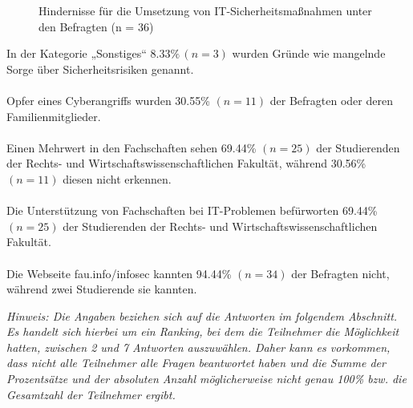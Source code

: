 \documentclass[german,report]{i1thesis}
\begin{document}
\begin{figure}[H]
\centering
{}
\caption{Hindernisse für die Umsetzung von IT-Sicherheitsmaßnahmen unter den Befragten (n = 36)}
\label{fig:hindernisse_it_sicherheit_balken}
\end{figure}
In der Kategorie „Sonstiges“ \(8.33\% \,(n = 3)\) wurden Gründe wie mangelnde Sorge über Sicherheitsrisiken genannt.\\
\\
Opfer eines Cyberangriffs wurden 30.55\% \((n = 11)\) der Befragten oder deren Familienmitglieder.\\
\\
Einen Mehrwert in den Fachschaften sehen 69.44\% \((n = 25)\) der Studierenden der Rechts- und Wirtschaftswissenschaftlichen Fakultät, während 30.56\% \((n = 11)\) diesen nicht erkennen.\\
\\
Die Unterstützung von Fachschaften bei IT-Problemen befürworten 69.44\% \((n = 25)\) der Studierenden der Rechts- und Wirtschaftswissenschaftlichen Fakultät.\\
\\
Die Webseite fau.info/infosec kannten 94.44\% \((n = 34)\) der Befragten nicht, während zwei Studierende sie kannten.

\textit{Hinweis: Die Angaben beziehen sich auf die Antworten im folgendem Abschnitt. Es handelt sich hierbei um ein Ranking, bei dem die Teilnehmer die Möglichkeit hatten, zwischen 2 und 7 Antworten auszuwählen. Daher kann es vorkommen, dass nicht alle Teilnehmer alle Fragen beantwortet haben und die Summe der Prozentsätze und der absoluten Anzahl möglicherweise nicht genau 100\% bzw. die Gesamtzahl der Teilnehmer ergibt.}
\end{document}
